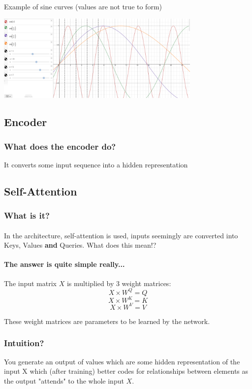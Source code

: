 \documentclass{article}
\begin{document}
    Example of sine curves (values are not true to form)

    \includegraphics[width=10.0cm]{fig5.png}

    \subsection{Encoder}
    \subsubsection{What does the encoder do?}
    It converts some input sequence into a hidden representation 

    \subsection{Self-Attention}
    \subsubsection{What is it?}

    \paragraph{} In the architecture, self-attention is used, inputs seemingly are converted into Keys, Values \textbf{and} Queries. What does this mean!?
    \paragraph{The answer is quite simple really...} The input matrix $X$ is multiplied by 3 weight matrices:
    \[ X \times W^Q = Q \]
    \[ X \times W^K = K \]
    \[ X \times W^V = V \]

    These weight matrices are parameters to be learned by the network.

    \subsubsection{Intuition?}
    You generate an output of values which are some hidden representation of the input X which (after training) better codes for relationships between elements as the output "attends" to the whole input $X$.
\end{document}
